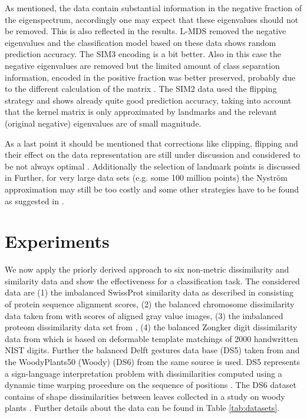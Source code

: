 \documentclass[twoside,11pt]{article}
\begin{document}
As mentioned, the data contain substantial information in the negative fraction of the eigenspectrum, accordingly one may
expect that these eigenvalues should not be removed.
This is also reflected in the results. L-MDS removed the negative eigenvalues
and the classification model based on these data shows random prediction accuracy.
The SIM3 encoding is a bit better. 
Also in this case the negative eigenvalues are removed but the limited amount of class separation information, encoded 
in the positive fraction was better preserved, probably due to the different calculation of the matrix .
The SIM2 data used the flipping strategy and shows already quite good prediction accuracy, taking into account that the
kernel matrix is only approximated by  landmarks and the relevant (original negative) eigenvalues are of small magnitude.

As a last point it should be mentioned that corrections like clipping, flipping and their effect
on the data representation are still under discussion and considered to be not always optimal \cite{Pekalska2005a}. 
Additionally the selection of landmark points is discussed in \cite{DBLP:journals/tnn/ZhangK10a,DBLP:journals/jmlr/KumarMT12}
Further, for very large data sets (e.g. some 100 million points) the Nystr\"om approximation may still be 
too costly and some other strategies have to be found as suggested in \cite{DBLP:conf/icml/LiKL10}.

\section{Experiments}
We now apply the priorly derived approach to six non-metric dissimilarity and similarity data and show the effectiveness for a classification task.
The considered data are  (1)  the imbalanced SwissProt similarity data as described in \cite{mediansom} consisting of protein sequence alignment
scores, (2) the balanced chromosome dissimilarity data taken from \cite{neuhaus} with scores of aligned gray value images, (3) the imbalanced proteom dissimilarity 
data set  from \cite{PrTools:2012:Online}, (4) the balanced Zongker digit dissimilarity data from \cite{PrTools:2012:Online,Jain19971386} which
is based on deformable template matchings of 2000 handwritten NIST digits. Further the balanced Delft gestures data base (DS5) 
taken from \cite{PrTools:2012:Online} and the WoodyPlants50 (Woody) (DS6) from the same source is used. 
DS5 represents a sign-language interpretation problem with dissimilarities computed 
using a dynamic time warping procedure  on the sequence of positions \cite{Lichtenauer20082040}. 
The DS6 dataset contains of shape dissimilarities between leaves collected in a study on woody plants \cite{DBLP:journals/pami/LingJ07}.
Further details about the data can be found in Table \ref{tab:datasets}.
\end{document}
